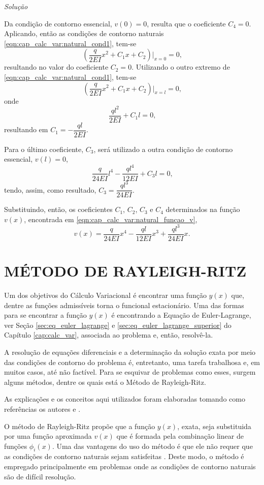 \documentclass[
	12pt,				%
	openright,			%
    twoside,			%
	a4paper,			%
	english,			%
	french,				%
	spanish,			%
	brazil				%
	]{abntex2}
\makeatletter
\renewenvironment{proof}[1][\proofname]{
	\par\pushQED{\qed}%
	\normalfont \topsep6\p@\@plus6\p@\relax
	\trivlist
	\item\relax
		{\itshape
			#1\@addpunct{.}}\hspace\labelsep\ignorespaces
}{%
	\popQED\endtrivlist\@endpefalse
}
\newenvironment{solution}{
	\begin{proof}[Solução]
}{%
	\end{proof}
}
\numberwithin{lema}{chapter}
\numberwithin{teorema}{chapter}
\numberwithin{definicao}{chapter}
\numberwithin{exemplo}{chapter}
\numberwithin{figure}{chapter}
\makeatother
\begin{document}
\begin{solution}
	Da condição de contorno essencial, $v(0)=0$, resulta que o coeficiente $C_4=0$. Aplicando, então as condições de contorno naturais \eqref{eqn:cap_calc_var:natural_cond1}, tem-se
	$$
		\left (
			\frac{q}{2EI}x^2 + C_1x + C_2
		\right ) \Big |_{x=0}
		= 0
		\text{,}
	$$
	resultando no valor do coeficiente $C_2=0$. Utilizando o outro extremo de \eqref{eqn:cap_calc_var:natural_cond1}, tem-se
	$$
		\left (
			\frac{q}{2EI}x^2 + C_1x + C_2
		\right ) \Big |_{x=l}
		=0
		\text{,}
	$$
	onde
	$$
		\frac{ql^2}{2EI}+C_1l=0
		\text{,}
	$$
	resultando em $C_1=-\dfrac{ql}{2EI}$.

	Para o último coeficiente, $C_3$, será utilizado a outra condição de contorno essencial, $v(l)=0$,
	$$
		\frac{q}{24EI}l^4
		-
		\frac{ql^4}{12EI}
		+
		C_3l
		= 0
		\text{,}
	$$
	tendo, assim, como resultado, $C_3=\dfrac{ql^3}{24EI}$.

	Substituindo, então, os coeficientes $C_1$, $C_2$, $C_3$ e $C_4$ determinados na função $v(x)$, encontrada em \eqref{eqn:cap_calc_var:natural_funcao_v},
	\begin{equation}
	\label{eqn:sol_funcional_analitico}
	v(x) = 
		\frac{q}{24EI} x^4
		-
		\frac{ql}{12EI} x^3
		+
		\frac{ql^3}{24EI} x
		\text{.}
	\end{equation}
\end{solution}

\chapter{MÉTODO DE RAYLEIGH-RITZ}
\label{cap:mrr}

Um dos objetivos do Cálculo Variacional é encontrar uma função $y(x)$ que, dentre as funções admissíveis torna o funcional estacionário. Uma das formas para se encontrar a função $y(x)$ é encontrando a Equação de Euler-Lagrange, ver Seção \ref{sec:eq_euler_lagrange} e \ref{sec:eq_euler_lagrange_superior} do Capítulo \ref{cap:calc_var}, associada ao problema e, então, resolvê-la. 

A resolução de equações diferenciais e a determinação da solução exata por meio das condições de contorno do problema é, entretanto,  uma tarefa trabalhosa e, em muitos casos, até não factível. Para se esquivar de problemas como esses, surgem alguns métodos, dentre os quais está o Método de Rayleigh-Ritz.

As explicações e os conceitos aqui utilizados foram elaboradas tomando como referências os autores  e .

O método de Rayleigh-Ritz propõe que a função $y(x)$, exata, seja substituida por uma função aproximada $v(x)$ que é formada pela combinação linear de funções $\phi _i(x)$. Uma das vantagens do uso do método é que ele não requer que as condições de contorno naturais sejam satisfeitas \cite{GROSSI_2001}. Deste modo, o método é empregado principalmente em problemas onde as condições de contorno naturais são de difícil resolução.
\end{document}
